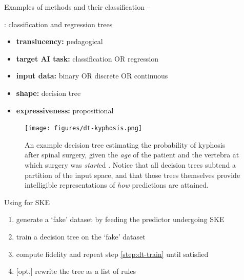 \documentclass[presentation]{beamer}\mode<presentation>{\usetheme{AMSBolognaFC}}
\begin{document}
\begin{frame}[allowframebreaks]{Examples of methods and their classification -- \cart}
    \begin{block}{\textbf{\cart}: classification and regression trees}
        \begin{itemize}
            \item \textbf{translucency:} pedagogical
            \item \textbf{target AI task:} classification OR regression
            \item \textbf{input data:} binary OR discrete OR continuous
            \item \textbf{shape:} decision tree
            \item \textbf{expressiveness:} propositional
        \end{itemize}
    \end{block}

    \framebreak

    \begin{figure}
        \centering
        \texttt{[image: figures/dt-kyphosis.png]}
        \caption{An example decision tree estimating the probability of kyphosis after spinal surgery, given the \emph{age} of the patient and the vertebra at which surgery was \emph{start}ed \cite{wiki:dt-learning}. Notice that all decision trees subtend a partition of the input space, and that those trees themselves provide intelligible representations of \emph{how} predictions are attained.}
        \label{fig:dt-example}
    \end{figure}

    \framebreak

    \begin{exampleblock}{Using \cart{} for SKE}
        \begin{enumerate}
            \item \alert{generate} a `fake' dataset by feeding the predictor undergoing SKE
            \item\label{step:dt-train} \alert{train} a decision tree on the `fake' dataset
            \item compute \alert{fidelity} and \alert{repeat} step \ref{step:dt-train} until satisfied
            \item \alert{[opt.]} rewrite the tree as a \alert{list of rules}
        \end{enumerate}
    \end{exampleblock}

\end{frame}
\end{document}
